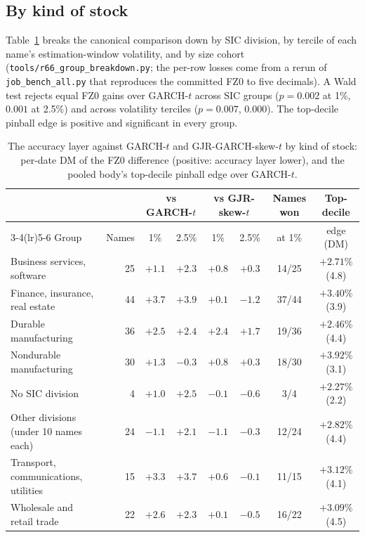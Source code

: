 \documentclass[11pt]{article}
\begin{document}
\subsection*{By kind of stock}
Table~\ref{tab:groups} breaks the canonical comparison down by SIC division, by tercile of each name's estimation-window volatility, and by size cohort (\texttt{tools/r66\_group\_breakdown.py}; the per-row losses come from a rerun of \texttt{job\_bench\_all.py} that reproduces the committed FZ0 to five decimals). A Wald test rejects equal FZ0 gains over GARCH-$t$ across SIC groups ($p=0.002$ at 1\%, $0.001$ at 2.5\%) and across volatility terciles ($p=0.007$, $0.000$). The top-decile pinball edge is positive and significant in every group.

\begin{table}[htbp]\centering\begin{threeparttable}
\caption{The accuracy layer against GARCH-$t$ and GJR-GARCH-skew-$t$ by kind of stock: per-date DM of the FZ0 difference (positive: accuracy layer lower), and the pooled body's top-decile pinball edge over GARCH-$t$.}\label{tab:groups}\footnotesize\setlength{\tabcolsep}{4pt}
\begin{tabular}{lrcccccc}\toprule
 & & \multicolumn{2}{c}{vs GARCH-$t$} & \multicolumn{2}{c}{vs GJR-skew-$t$} & Names won & Top-decile \\ \cmidrule(lr){3-4}\cmidrule(lr){5-6}
Group & Names & 1\% & 2.5\% & 1\% & 2.5\% & at 1\% & edge (DM) \\ \midrule
Business services, software & 25 & $+1.1$ & $+2.3$ & $+0.8$ & $+0.3$ & 14/25 & $+2.71\%$ (4.8) \\
Finance, insurance, real estate & 44 & $+3.7$ & $+3.9$ & $+0.1$ & $-1.2$ & 37/44 & $+3.40\%$ (3.9) \\
Durable manufacturing & 36 & $+2.5$ & $+2.4$ & $+2.4$ & $+1.7$ & 19/36 & $+2.46\%$ (4.4) \\
Nondurable manufacturing & 30 & $+1.3$ & $-0.3$ & $+0.8$ & $+0.3$ & 18/30 & $+3.92\%$ (3.1) \\
No SIC division & 4 & $+1.0$ & $+2.5$ & $-0.1$ & $-0.6$ & 3/4 & $+2.27\%$ (2.2) \\
Other divisions (under 10 names each) & 24 & $-1.1$ & $+2.1$ & $-1.1$ & $-0.3$ & 12/24 & $+2.82\%$ (4.4) \\
Transport, communications, utilities & 15 & $+3.3$ & $+3.7$ & $+0.6$ & $-0.1$ & 11/15 & $+3.12\%$ (4.1) \\
Wholesale and retail trade & 22 & $+2.6$ & $+2.3$ & $+0.1$ & $-0.5$ & 16/22 & $+3.09\%$ (4.5) \\

\end{tabular}
\end{threeparttable}
\end{table}
\end{document}
